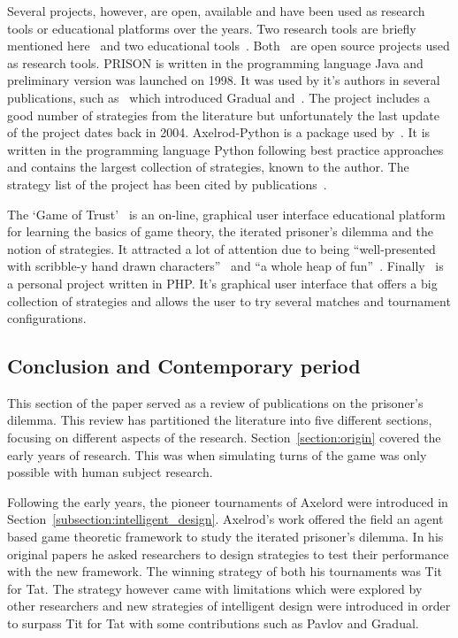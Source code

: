 \documentclass{article}
\theoremstyle{definition}
\begin{document}
Several projects, however, are open, available and have been used as research
tools or educational platforms over the years. Two research tools are briefly
mentioned here~\cite{prison, axelrodproject} and two educational
tools~\cite{pd_trust, pd_game}. Both~\cite{prison, axelrodproject} are open
source projects used as research tools. PRISON is written in the programming
language Java and preliminary version was launched on 1998. It was used by it's
authors in several publications, such as~\cite{Beaufils1997} which introduced
Gradual and~\cite{Beaufils1988}. The project includes a good number of
strategies from the literature but unfortunately the last update of the project
dates back in 2004. Axelrod-Python is a package used
by~\cite{Knight2017,KnightHGC17, Goodman2018, Wang2017}. It is written in the
programming language Python following best practice approaches and contains the
largest collection of strategies, known to the author. The strategy list of
the project has been cited by publications~\cite{Anastassacos2018, Hayes2017,
Neumann2018}.

The `Game of Trust'~\cite{pd_trust} is an on-line, graphical user interface
educational platform for learning the basics of game theory, the iterated
prisoner's dilemma and the notion of strategies. It attracted a lot of attention
due to being ``well-presented with scribble-y hand drawn
characters''~\cite{trust_blogb} and ``a whole heap of fun''~\cite{trust_bloga}.
Finally~\cite{pd_game} is a personal project written in PHP. It's graphical user
interface that offers a big collection of strategies and allows the user to try
several matches and tournament configurations.

\subsection{Conclusion and Contemporary period}\label{section:contemporary_period}

This section of the paper served as a review of publications on the prisoner's
dilemma. This review has partitioned the literature into five different sections,
focusing on different aspects of the research. Section~\ref{section:origin}
covered the early years of research. This was when simulating turns of the game
was only possible with human subject research.

Following the early years, the pioneer tournaments of Axelord were introduced in
Section~\ref{subsection:intelligent_design}. Axelrod's work offered the field an
agent based game theoretic framework to study the iterated prisoner's dilemma.
In his original papers he asked researchers to design strategies to test their
performance with the new framework. The winning strategy of both his tournaments
was Tit for Tat. The strategy however came with limitations which were explored
by other researchers and new strategies of intelligent design were introduced in
order to surpass Tit for Tat with some contributions such as Pavlov and Gradual.
\end{document}
